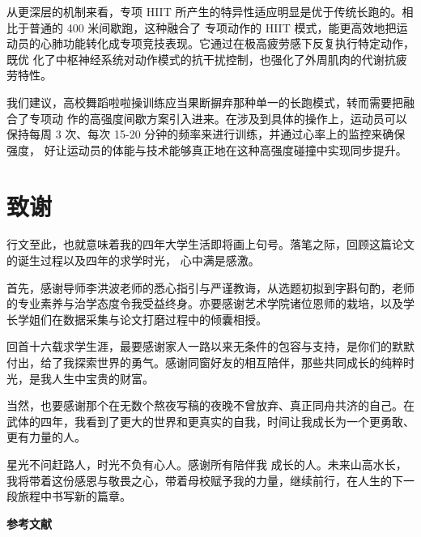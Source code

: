\documentclass[a4paper,12pt]{article}
\newcommand{\heiti}{\CJKfamily{hei}}
\newcommand{\xiaoer}{\fontsize{18}{24}\selectfont}
\begin{document}
从更深层的机制来看，专项 HIIT 所产生的特异性适应明显是优于传统长跑的。相比于普通的 400 米间歇跑，这种融合了
专项动作的 HIIT 模式，能更高效地把运动员的心肺功能转化成专项竞技表现。它通过在极高疲劳感下反复执行特定动作，既优
化了中枢神经系统对动作模式的抗干扰控制，也强化了外周肌肉的代谢抗疲劳特性。

我们建议，高校舞蹈啦啦操训练应当果断摒弃那种单一的长跑模式，转而需要把融合了专项动
作的高强度间歇方案引入进来。在涉及到具体的操作上，运动员可以保持每周 3 次、每次 15-20 分钟的频率来进行训练，并通过心率上的监控来确保强度，
好让运动员的体能与技术能够真正地在这种高强度碰撞中实现同步提升。

\cleardoublepage
\section*{致\quad 谢}
行文至此，也就意味着我的四年大学生活即将画上句号。落笔之际，回顾这篇论文
的诞生过程以及四年的求学时光，
心中满是感激。

首先，感谢导师李洪波老师的悉心指引与严谨教诲，从选题初拟到字斟句酌，老师的专业素养与治学态度令我受益终身。亦要感谢艺术学院诸位恩师的栽培，以及学长学姐们在数据采集与论文打磨过程中的倾囊相授。

回首十六载求学生涯，最要感谢家人一路以来无条件的包容与支持，是你们的默默付出，给了我探索世界的勇气。感谢同窗好友的相互陪伴，那些共同成长的纯粹时光，是我人生中宝贵的财富。

当然，也要感谢那个在无数个熬夜写稿的夜晚不曾放弃、真正同舟共济的自己。在武体的四年，我看到了更大的世界和更真实的自我，时间让我成长为一个更勇敢、更有力量的人。

星光不问赶路人，时光不负有心人。感谢所有陪伴我
成长的人。未来山高水长，我将带着这份感恩与敬畏之心，带着母校赋予我的力量，继续前行，在人生的下一段旅程中书写新的篇章。
\cleardoublepage
\begin{center}
    {\heiti\xiaoer\bfseries 参考文献}
\end{center}
\vspace{1em}
\end{document}
